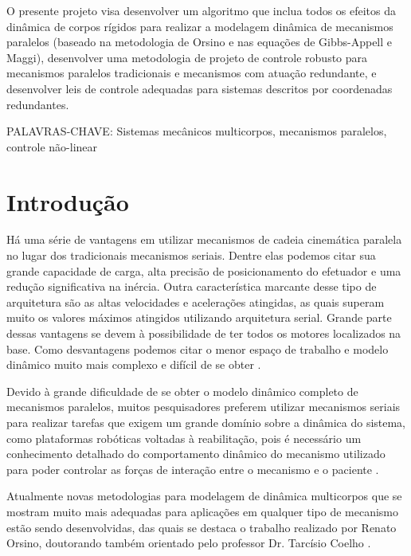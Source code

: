 \documentclass[a4paper,11pt,brazil,fleqn]{article}
\begin{document}
O presente projeto visa desenvolver um algoritmo que inclua todos os efeitos da din\^amica de corpos r\'igidos para realizar a modelagem din\^amica de mecanismos paralelos (baseado na metodologia de Orsino e nas equa\c{c}\~oes de Gibbs-Appell e Maggi), desenvolver uma metodologia de projeto de controle robusto para mecanismos paralelos tradicionais e mecanismos com atua\c{c}\~ao redundante, e desenvolver leis de controle adequadas para sistemas descritos por coordenadas redundantes.

\vspace{10pt}

\noindent
PALAVRAS-CHAVE: {Sistemas mec\^anicos multicorpos, mecanismos paralelos, controle n\~ao-linear}






\newpage
\section{Introdu\c{c}\~ao}\label{S01}

H\'a uma s\'erie de vantagens em utilizar mecanismos de cadeia cinem\'atica paralela no lugar dos tradicionais mecanismos seriais. Dentre elas podemos citar sua grande capacidade de carga, alta precis\~ao de posicionamento do efetuador e uma redu\c{c}\~ao significativa na in\'ercia. Outra caracter\'istica marcante desse tipo de arquitetura s\~ao as altas velocidades e acelera\c{c}\~oes atingidas, as quais superam muito os valores m\'aximos atingidos utilizando arquitetura serial. Grande parte dessas vantagens se devem \`a possibilidade de ter todos os motores localizados na base. Como desvantagens podemos citar o menor espa\c{c}o de trabalho e modelo din\^amico muito mais complexo e dif\'icil de se obter \cite{Merlet2002, Rynaldo}. 

	Devido \`a grande dificuldade de se obter o modelo din\^amico completo de mecanismos paralelos, muitos pesquisadores preferem utilizar mecanismos seriais para realizar tarefas que exigem um grande dom\'inio sobre a din\^amica do sistema, como plataformas rob\'oticas voltadas \`a reabilita\c{c}\~ao, pois \'e necess\'ario um conhecimento detalhado do comportamento din\^amico do mecanismo utilizado para poder controlar as for\c{c}as de intera\c{c}\~ao entre o mecanismo e o paciente \cite{Andre, Andre2}.
	
	Atualmente novas metodologias para modelagem de din\^amica multicorpos que se mostram muito mais adequadas para aplica\c{c}\~oes em qualquer tipo de mecanismo est\~ao sendo desenvolvidas, das quais se destaca o trabalho realizado por Renato Orsino, doutorando tamb\'em orientado pelo professor Dr. Tarc\'isio Coelho \cite{Orsino2013, Apostila}.
	
\end{document}

